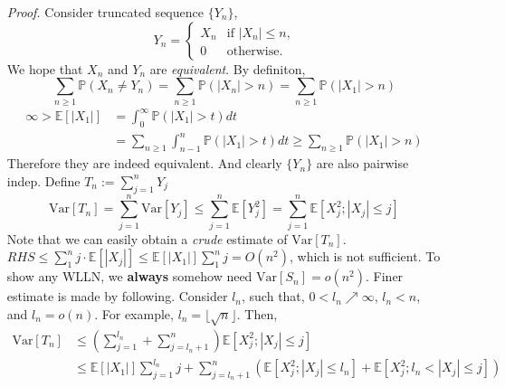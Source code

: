 \documentclass[a4paper,12pt,twoside]{book}
\begin{document}
\begin{itemize}
	\item[\textit{Proof.}] Consider truncated sequence $\{Y_n\}$,
	\begin{equation*}
		Y_n = \begin{cases}
		X_n &\text{if $|X_n|\leq n$,}\\
		0 &\text{otherwise.}
		\end{cases}
	\end{equation*}
	We hope that $X_n$ and $Y_n$ are \textit{equivalent}. By definiton,
	\begin{equation}
		\sum_{n\geq 1}\mathbb{P}\left(X_n\ne Y_n\right)=\sum_{n\geq 1}\mathbb{P}\left(|X_n|>n\right)=\sum_{n\geq 1}\mathbb{P}\left(|X_1|>n\right)
	\end{equation}
	\begin{equation}
		\begin{split}
			\infty>\mathbb{E}\left[|X_1|\right]&=\int_0^{\infty}\mathbb{P}\left(|X_1|>t\right)dt\\
			&=\sum_{n\geq 1}\int_{n-1}^n \mathbb{P}\left(|X_1|>t\right)dt\geq \sum_{n\geq 1}\mathbb{P}\left(|X_1|>n\right)
		\end{split}
	\end{equation}
	Therefore they are indeed equivalent. And clearly $\{Y_n\}$ are also pairwise indep.\newline
	Define $T_n:=\sum_{j=1}^n Y_j$
	\begin{equation}
		\mathrm{Var}\left[T_n\right]=\sum_{j=1}^n \mathrm{Var}\left[Y_j\right]\leq \sum_{j=1}^n \mathbb{E}\left[Y_j^2\right]=\sum_{j=1}^n \mathbb{E}\left[X_j^2; |X_j|\leq j\right]
	\end{equation}
	Note that we can easily obtain a \textit{crude} estimate of $\mathrm{Var}\left[T_n\right]$. $RHS \leq \sum_{1}^n j\cdot \mathbb{E}\left[|X_j|\right] \leq \mathbb{E}\left[|X_1|\right]\sum_1^nj = O(n^2)$, which is not sufficient. To show any WLLN, we \textbf{always} somehow need $\mathrm{Var}\left[S_n\right]=o(n^2)$.\newline
	Finer estimate is made by following. Consider $l_n$, such that, $0<l_n \nearrow \infty$, $l_n<n$, and $l_n=o(n)$. For example, $l_n = \lfloor\sqrt{n}\rfloor$. Then,
	\begin{equation}
		\begin{split}
			\mathrm{Var}\left[T_n\right]&\leq\left(\sum_{j=1}^{l_n}+\sum_{j=l_n+1}^n\right)\mathbb{E}\left[X_j^2; |X_j|\leq j\right]\\
			&\leq \mathbb{E}\left[|X_1|\right]\sum_{j=1}^{l_n}j + \sum_{j=l_n+1}^n \left(\mathbb{E}\left[X_j^2; |X_j|\leq l_n\right]+\mathbb{E}\left[X_j^2; l_n< |X_j|\leq j\right]\right)\\

\end{split}
\end{equation}
\end{itemize}
\end{document}
